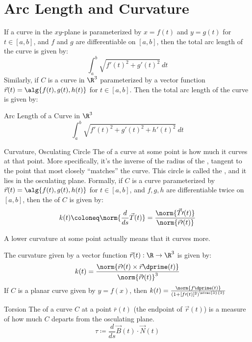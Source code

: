 \section{Arc Length and Curvature}
If a curve in the $xy$-plane is parameterized by $x=f(t)$ and $y=g(t)$ for $t \in [a,b]$, and $f$ and $g$ are differentiable on $[a,b]$, then the total arc length of the curve is given by:
\[ \int_a^b \sqrt{f\prime(t)^2 + g\prime(t)^2}\ dt\]
Similarly, if $C$ is a curve in $\R^3$ parameterized by a vector function $\vec{r}(t) = \alg{f(t), g(t), h(t)}$ for $t \in [a,b]$. Then the total arc length of the curve is given by:
\begin{genbox}{Arc Length of a Curve in $\R^3$}
\[ \int_a^b \sqrt{f\prime(t)^2 + g\prime(t)^2 + h\prime(t)^2}\ dt \]
\end{genbox}


\begin{dfnbox}{Curvature, Osculating Circle}{}
    The  of a curve at some point is how much it curves at that point. More specifically, it's the inverse of the radius of the , tangent to the point that most closely ``matches'' the curve. This circle is called the , and it lies in the osculating plane.
    \tcblower
    Formally, if $C$ is a curve parameterized by $\vec{r}(t) = \alg{f(t), g(t), h(t)}$ for $t \in [a,b]$, and $f,g,h$ are differentiable twice on $[a,b]$, then the  of $C$ is given by:
    \[ k(t) \coloneq \norm{\frac{d}{ds} \vec{T}(t)} = \frac{\norm{\vec{T}\prime(t)}}{\norm{\vec{r}\prime(t)}} \]
\end{dfnbox}

A lower curvature at some point actually means that it curves more.

\begin{thmbox}{}{}
    The curvature given by a vector function $\vec{r}(t) : \R \to \R^3$ is given by:
    \[ k(t) = \frac{\norm{\vec{r}\prime(t) \times \vec{r}\dprime(t)}}{\norm{\vec{r}\prime(t)}^3} \]
    If $C$ is a planar curve given by $y = f(x)$, then $k(t) = \frac{\norm{f\dprime(t)}}{\left( 1+[f\prime(t)]^2 \right)^{\sfrac{3}{2}}}$
\end{thmbox}

\begin{dfnbox}{Torsion}{}
    The  of a curve $C$ at a point $\bar{r}(t)$ (the endpoint of $\vec{r}(t)$) is a measure of how much $C$ departs from the osculating plane.
    \[ \tau \coloneq \frac{d}{ds} \vec{B}(t) \cdot \vec{N}(t) \]
\end{dfnbox}

